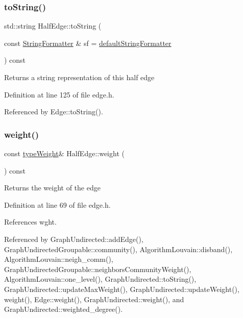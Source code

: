 \subsubsection{\texorpdfstring{to\+String()}{toString()}}
{\footnotesize\ttfamily std\+::string Half\+Edge\+::to\+String (\begin{DoxyParamCaption}\item[{const \hyperlink{classStringFormatter}{String\+Formatter} \&}]{sf = {\ttfamily \hyperlink{stringFormatter_8h_abf1349c8e24162d0134072aff288f2a2}{default\+String\+Formatter}} }\end{DoxyParamCaption}) const\hspace{0.3cm}{\ttfamily [inline]}}

\begin{DoxyReturn}{Returns}
a string representation of this half edge 
\end{DoxyReturn}


Definition at line 125 of file edge.\+h.



Referenced by Edge\+::to\+String().

\mbox{\label{classHalfEdge_a89cc13d21ae44a9d9c2ba95f89576090}} 
\subsubsection{\texorpdfstring{weight()}{weight()}\hspace{0.1cm}{\footnotesize\ttfamily [1/2]}}
{\footnotesize\ttfamily const \hyperlink{edge_8h_a2e7ea3be891ac8b52f749ec73fee6dd2}{type\+Weight}\& Half\+Edge\+::weight (\begin{DoxyParamCaption}{ }\end{DoxyParamCaption}) const\hspace{0.3cm}{\ttfamily [inline]}}

\begin{DoxyReturn}{Returns}
the weight of the edge 
\end{DoxyReturn}


Definition at line 69 of file edge.\+h.



References wght.



Referenced by Graph\+Undirected\+::add\+Edge(), Graph\+Undirected\+Groupable\+::community(), Algorithm\+Louvain\+::disband(), Algorithm\+Louvain\+::neigh\+\_\+comm(), Graph\+Undirected\+Groupable\+::neighbors\+Community\+Weight(), Algorithm\+Louvain\+::one\+\_\+level(), Graph\+Undirected\+::to\+String(), Graph\+Undirected\+::update\+Max\+Weight(), Graph\+Undirected\+::update\+Weight(), weight(), Edge\+::weight(), Graph\+Undirected\+::weight(), and Graph\+Undirected\+::weighted\+\_\+degree().

